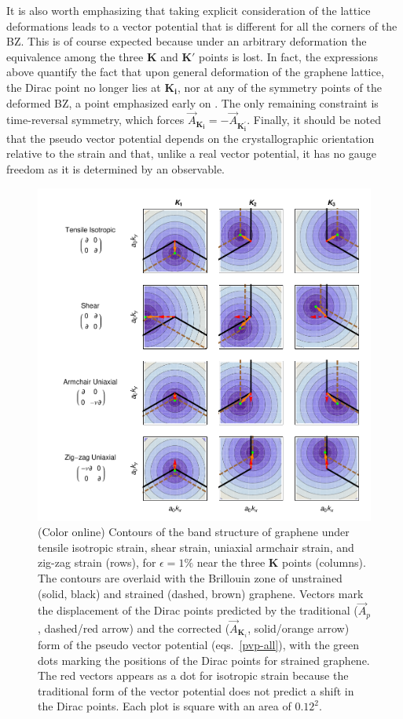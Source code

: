 It is also worth emphasizing that taking explicit consideration of the lattice deformations leads to a vector potential that is different for all the corners of the BZ.
This is of course expected because under an arbitrary deformation the equivalence among the three $\bm{K}$ and $\bm{K'}$ points is lost.
In fact, the expressions above quantify the fact that upon general deformation of the graphene lattice, the Dirac point no longer lies at $\bm{K_i}$, nor at any of the symmetry points of the deformed BZ, a point emphasized early on \cite{Pereira2009}.
The only remaining constraint is time-reversal symmetry, which forces $\vec{A}_{\bm{K_i}} = - \vec{A}_{\bm{K_i^\prime}}$.
Finally, it should be noted that the pseudo vector potential depends on the crystallographic orientation relative to the strain and that, unlike a real vector potential, it has no gauge freedom as it is determined by an observable.

\begin{figure}
\includegraphics{Figs_PVP/figure_2.pdf}
\caption{(Color online) Contours of the band structure of graphene under tensile isotropic strain, shear strain, uniaxial armchair strain, and zig-zag strain (rows), for $\epsilon=1\%$ near the three $\bm{K}$ points (columns). The contours are overlaid with the Brillouin zone of unstrained (solid, black)  and strained (dashed, brown) graphene. Vectors mark the displacement of the Dirac points predicted by the traditional ($\vec{A}_p$, dashed/red arrow) and the corrected ($\vec{A}_{\bm{K}_{\!i}}$, solid/orange arrow) form of the pseudo vector potential (eqs.~\ref{pvp-all}), with the green dots marking the positions of the Dirac points for strained graphene. The red vectors appears as a dot for isotropic strain because the traditional form of the vector potential does not predict a shift in the Dirac points.  Each plot is square with an area of $0.12^2$. \label{PVPshifts}}
\end{figure}


